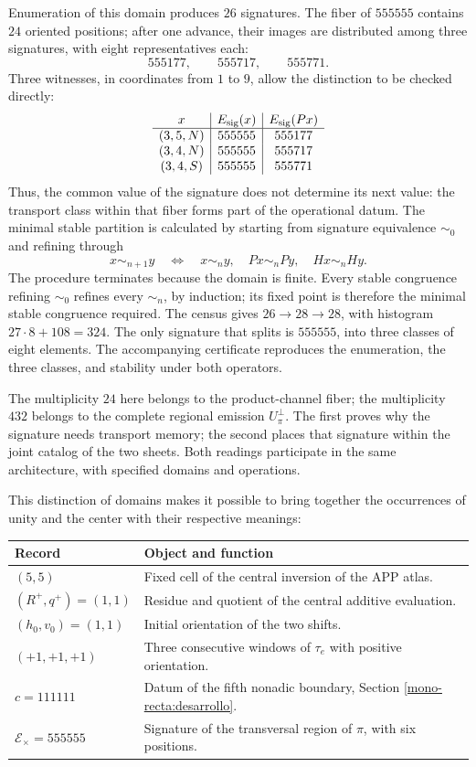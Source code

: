 Enumeration of this domain produces \(26\) signatures. The fiber of
\(555555\) contains \(24\) oriented positions; after one
advance, their images are distributed among three signatures, with eight
representatives each:
\[
 555177,\qquad555717,\qquad555771.
\]
Three witnesses, in coordinates from \(1\) to \(9\), allow the
distinction to be checked directly:
\[
\begin{array}{c|c|c}
x&E_{\rm sig}(x)&E_{\rm sig}(Px)\\\hline
(3,5,N)&555555&555177\\
(3,4,N)&555555&555717\\
(3,4,S)&555555&555771
\end{array}
\]
Thus, the common value of the signature does not determine its next value:
the transport class within that fiber forms part of the operational
datum. The minimal stable partition is calculated by starting from
signature equivalence \(\sim_0\) and refining through
\[
 x\sim_{n+1}y\quad\Longleftrightarrow\quad
 x\sim_n y,\quad Px\sim_n Py,\quad Hx\sim_n Hy.
\]
The procedure terminates because the domain is finite. Every stable
congruence refining \(\sim_0\) refines every \(\sim_n\), by induction;
its fixed point is therefore the minimal stable congruence required.
The census gives \(26\to28\to28\), with histogram
\(27\cdot8+108=324\). The only signature that splits is
\(555555\), into three classes of eight elements. The accompanying certificate
reproduces the enumeration, the three classes, and stability under both
operators.

The multiplicity \(24\) here belongs to the product-channel fiber;
the multiplicity \(432\) belongs to the complete regional emission
\(U_\pi^\perp\). The first proves why the signature needs transport
memory; the second places that signature within the joint catalog of
the two sheets. Both readings participate in the same architecture,
with specified domains and operations.

This distinction of domains makes it possible to bring together the occurrences of unity
and the center with their respective meanings:
\begin{center}
\small
\begin{tabularx}{\textwidth}{@{}lX@{}}
\toprule
Record & Object and function \\
\midrule
\((5,5)\) & Fixed cell of the central inversion of the APP atlas.\\
\((R^+,q^+)=(1,1)\) & Residue and quotient of the central additive evaluation.\\
\((h_0,v_0)=(1,1)\) & Initial orientation of the two shifts.\\
\((+1,+1,+1)\) & Three consecutive windows of \(\tau_e\) with positive orientation.\\
\(c=111111\) & Datum of the fifth nonadic boundary, Section \ref{mono-recta:desarrollo}.\\
\(\mathcal E_\times=555555\) & Signature of the transversal region of \(\pi\), with six positions.\\
\bottomrule
\end{tabularx}
\end{center}

